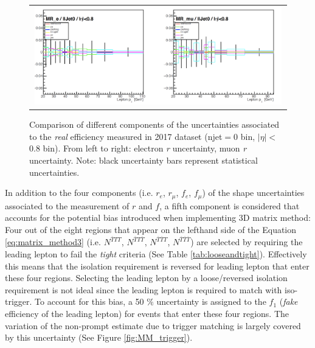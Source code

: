 \begin{figure}[tbh!]
 \begin{center}
 \begin{tabular}{c}
 \includegraphics[width=0.99\textwidth]{figures/Part3/Systematics/MR}
 \end{tabular}
 \caption{Comparison of different components of the uncertainties associated to the \emph{real} efficiency measured in 2017 dataset (njet$=$0 bin, $|\eta|<$0.8 bin). From left to right: electron \emph{r} uncertainty, muon \emph{r} uncertainty. Note: black uncertainty bars represent statistical uncertainties.}
 \label{fig:r_comp}
 \end{center}
\end{figure}

In addition to the four components (i.e. $r_e$, $r_{\mu}$, $f_e$, $f_{\mu}$) of the shape uncertainties associated to the measurement of $r$ and $f$, a fifth component is considered that accounts for the potential bias introduced when implementing 3D matrix method: Four out of the eight regions that appear on the lefthand side of the Equation \ref{eq:matrix_method3} (i.e. $N^{\overline{T}TT}$, $N^{\overline{T}T\overline{T}}$, $N^{\overline{T}\overline{T}T}$, $N^{\overline{T}\overline{T}\overline{T}}$) are selected by requiring the leading lepton to fail the \emph{tight} criteria (See Table \ref{tab:looseandtight}). Effectively this means that the isolation requirement is reversed for leading lepton that enter these four regions. Selecting the leading lepton by a loose/reversed isolation requirement is not ideal since the leading lepton is required to match with iso-trigger. To account for this bias, a 50 $\%$ uncertainty is assigned to the $f_1$ (\emph{fake} efficiency of the leading lepton) for events that enter these four regions. The variation of the non-prompt estimate due to trigger matching is largely covered by this uncertainty (See Figure \ref{fig:MM_trigger}).

